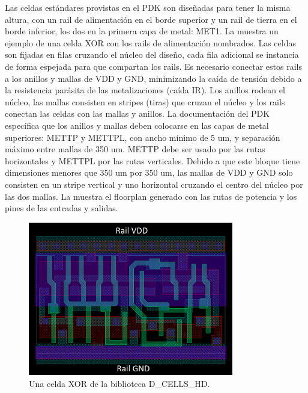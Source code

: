 \documentclass[a4paper, twoside, 11pt]{report}
\begin{document}
Las celdas estándares provistas en el PDK son diseñadas para tener la misma altura, con un rail de alimentación en el borde superior y un rail de tierra en el borde inferior, los dos en la primera capa de metal: MET1. La  muestra un ejemplo de una celda XOR con los rails de alimentación nombrados. Las celdas son fijadas en filas cruzando el núcleo del diseño, cada fila adicional se instancia de forma espejada para que compartan los rails. Es necesario conectar estos rails a los anillos y mallas de VDD y GND, minimizando la caída de tensión debido a la resistencia parásita de las metalizaciones (caída IR). Los anillos rodean el núcleo, las mallas consisten en stripes (tiras) que cruzan el núcleo y los rails conectan las celdas con las mallas y anillos. La documentación del PDK~\cite{dig_imp_guidelines} específica que los anillos y mallas deben colocarse en las capas de metal superiores: METTP y METTPL, con ancho mínimo de 5 um, y separación máximo entre mallas de 350 um. METTP debe ser usado por las rutas horizontales y METTPL por las rutas verticales. Debido a que este bloque tiene dimensiones menores que 350 um por 350 um, las mallas de VDD y GND solo consisten en un stripe vertical y uno horizontal cruzando el centro del núcleo por las dos mallas. La  muestra el floorplan generado con las rutas de potencia y los pines de las entradas y salidas.

\begin{figure}[htb]
  \centering
  \includegraphics[width=0.8\textwidth]{./img/xor_cell}
  \caption{Una celda XOR de la biblioteca D\_CELLS\_HD.}
  \label{fig:xor_cell}
\end{figure}
\end{document}

